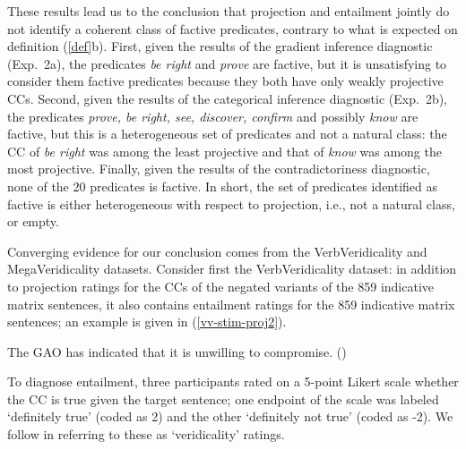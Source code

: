 \documentclass[11pt,fleqn]{article}
\newcommand{\6}{\mbox{$[\hspace*{-.6mm}[$}}
\newcommand{\9}{\mbox{$]\hspace*{-.6mm}]$}}
\begin{document}
These results lead us to the conclusion that projection and entailment jointly do not identify a coherent class of factive predicates, contrary to what is expected on definition (\ref{def}b). First, given the results of the gradient inference diagnostic (Exp.~2a), the predicates {\em be right} and {\em prove} are factive, but it is unsatisfying to consider them factive predicates because they both have only weakly projective CCs. Second, given the results of the categorical inference diagnostic (Exp.~2b), the predicates {\em prove, be right, see, discover, confirm} and possibly {\em know} are factive, but this is a heterogeneous set of predicates and not a natural class: the CC of {\em be right} was among the least projective and that of {\em know} was among the most projective. Finally, given the results of the contradictoriness diagnostic, none of the 20 predicates is factive. In short, the set of predicates identified as factive is either heterogeneous with respect to projection, i.e., not a natural class, or empty. 

Converging evidence for our conclusion comes from the VerbVeridicality and MegaVeridicality datasets. Consider first the VerbVeridicality dataset: in addition to projection ratings for the CCs of the negated variants of the 859 indicative matrix sentences, it also contains entailment ratings for the 859 indicative matrix sentences; an example is given in (\ref{vv-stim-proj2}). 

\begin{exe}
\ex\label{vv-stim-proj2} The GAO has indicated that it is unwilling to compromise.  \hfill (\citealt[2234]{ross-pavlick2019})
\end{exe}
To diagnose entailment, three participants rated on a 5-point Likert scale whether the CC is true given the target sentence; one endpoint of the scale was labeled `definitely true' (coded as 2) and the other `definitely not true' (coded as -2). We follow \citet{ross-pavlick2019} in referring to these as `veridicality' ratings. 
\end{document}
